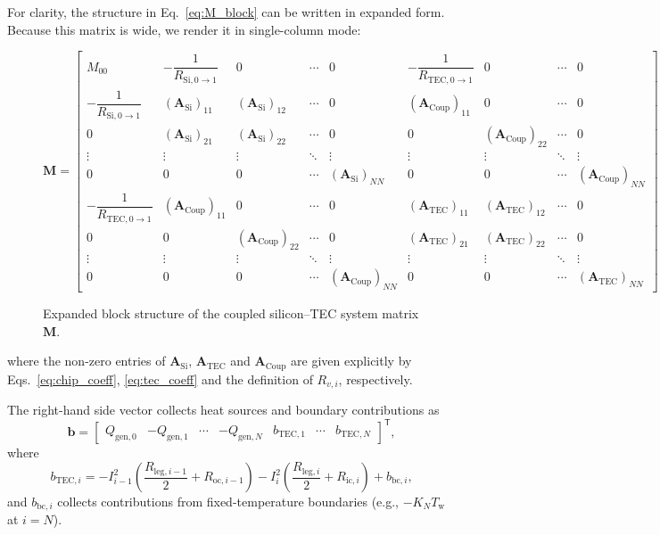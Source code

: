 \documentclass[conference]{IEEEtran}
\begin{document}
For clarity, the structure in Eq.~\eqref{eq:M_block} can be written in expanded form. Because this matrix is wide, we render it in single-column mode:
\begin{figure}[!t]
	\centering
	\[
	\mathbf{M} =
	\begin{bmatrix}
		M_{00} & -\dfrac{1}{R_{\text{Si},0\to1}} & 0 & \cdots & 0 & -\dfrac{1}{R_{\text{TEC},0\to1}} & 0 & \cdots & 0 \\
		-\dfrac{1}{R_{\text{Si},0\to1}} & (\mathbf{A}_{\text{Si}})_{11} & (\mathbf{A}_{\text{Si}})_{12} & \cdots & 0 & (\mathbf{A}_{\text{Coup}})_{11} & 0 & \cdots & 0 \\
		0 & (\mathbf{A}_{\text{Si}})_{21} & (\mathbf{A}_{\text{Si}})_{22} & \cdots & 0 & 0 & (\mathbf{A}_{\text{Coup}})_{22} & \cdots & 0 \\
		\vdots & \vdots & \vdots & \ddots & \vdots & \vdots & \vdots & \ddots & \vdots \\
		0 & 0 & 0 & \cdots & (\mathbf{A}_{\text{Si}})_{NN} & 0 & 0 & \cdots & (\mathbf{A}_{\text{Coup}})_{NN} \\
		-\dfrac{1}{R_{\text{TEC},0\to1}} & (\mathbf{A}_{\text{Coup}})_{11} & 0 & \cdots & 0 & (\mathbf{A}_{\text{TEC}})_{11} & (\mathbf{A}_{\text{TEC}})_{12} & \cdots & 0 \\
		0 & 0 & (\mathbf{A}_{\text{Coup}})_{22} & \cdots & 0 & (\mathbf{A}_{\text{TEC}})_{21} & (\mathbf{A}_{\text{TEC}})_{22} & \cdots & 0 \\
		\vdots & \vdots & \vdots & \ddots & \vdots & \vdots & \vdots & \ddots & \vdots \\
		0 & 0 & 0 & \cdots & (\mathbf{A}_{\text{Coup}})_{NN} & 0 & 0 & \cdots & (\mathbf{A}_{\text{TEC}})_{NN}
	\end{bmatrix}
	\]
	\caption{Expanded block structure of the coupled silicon--TEC system matrix $\mathbf{M}$.}
	\label{fig:M_expanded}
\end{figure}
where the non-zero entries of $\mathbf{A}_{\text{Si}}$, $\mathbf{A}_{\text{TEC}}$ and $\mathbf{A}_{\text{Coup}}$ are given explicitly by Eqs.~\eqref{eq:chip_coeff}, \eqref{eq:tec_coeff} and the definition of $R_{v,i}$, respectively.

The right-hand side vector collects heat sources and boundary contributions as
\begin{equation}
	\mathbf{b} = \begin{bmatrix}
		Q_{\text{gen},0} & -Q_{\text{gen},1} & \cdots & -Q_{\text{gen},N} & b_{\text{TEC},1} & \cdots & b_{\text{TEC},N}
	\end{bmatrix}^{\!\mathsf{T}},
	\label{eq:b_vector}
\end{equation}
where
\begin{equation}
	b_{\text{TEC},i} = - I_{i-1}^2 \left( \frac{R_{\text{leg},i-1}}{2} + R_{\text{oc},i-1} \right) - I_i^2 \left( \frac{R_{\text{leg},i}}{2} + R_{\text{ic},i} \right) + b_{\text{bc},i},
	\label{eq:b_tec_i}
\end{equation}
and $b_{\text{bc},i}$ collects contributions from fixed-temperature boundaries (e.g., $-K_N T_{\text{w}}$ at $i=N$).
\end{document}
